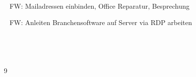 {{	\textbullet~ FW: Mailadressen einbinden, Office Reparatur, Besprechung\par
	\textbullet~ FW: Anleiten Branchensoftware auf Server via RDP arbeiten\par
	\textbullet~ \par
	\textbullet~ 
	}{}{9}
}{}
\Unterschrift
\newpage
